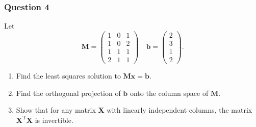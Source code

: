 \documentclass[12pt]{article}
\begin{document}
\subsubsection*{Question 4}
Let
\[
  \mathbf{M}=
  \begin{pmatrix}
    1 & 0 & 1\\
    1 & 0 & 2\\
    1 & 1 & 1\\
    2 & 1 & 1
  \end{pmatrix}
  \quad
  \mathbf{b}=
  \begin{pmatrix}
    2\\ 3\\ 1\\ 2
  \end{pmatrix}.
\]
\begin{enumerate}[label=\textbf{(\alph*)}]
\itemsep 0em
  \item Find the least squares solution to $\mathbf{Mx}=\mathbf{b}$.
  \item Find the orthogonal projection of $\mathbf{b}$ onto the column space of $\mathbf{M}$.
  \item Show that for any matrix $\mathbf{X}$ with linearly independent columns, the matrix $\mathbf{X}^{\text{T}}\mathbf{X}$ is invertible.
\end{enumerate}
\end{document}
